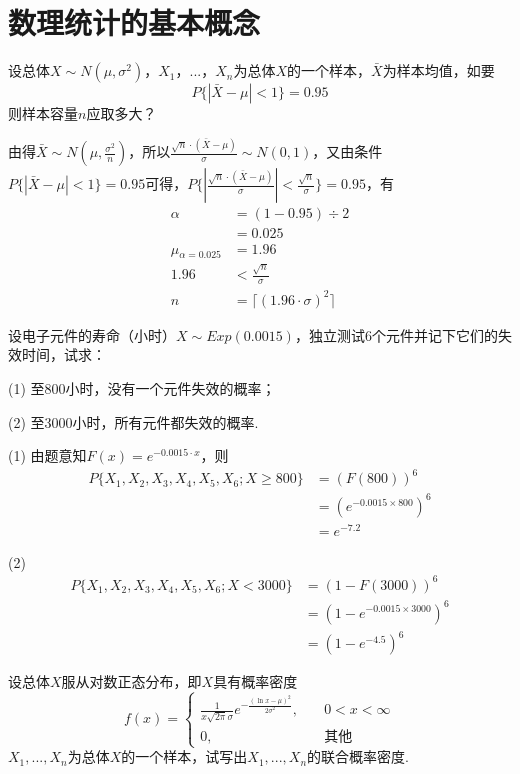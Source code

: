 \section{数理统计的基本概念}

   设总体$X \sim N(\mu, \sigma^2)$，$X_{1}$，...，$X_{n}$为总体$X$的一个样本，$\bar{X}$为样本均值，如要
  $$ P\{|\bar{X} - \mu| < 1\} = 0.95 $$
  则样本容量$n$应取多大？
  
  \xsv
  由得$\bar{X} \sim N(\mu, \frac{\sigma^2}{n})$，所以$\frac{\sqrt{n} \cdot (\bar{X} - \mu)}{\sigma} \sim N(0, 1)$，又由条件$P\{|\bar{X} - \mu| < 1\} = 0.95$可得，$P\{|\frac{\sqrt{n} \cdot (\bar{X} - \mu)}{\sigma}| < \frac{\sqrt{n}}{\sigma}\} = 0.95$，有
  \[ \begin{split}
    \alpha &= (1 - 0.95) \div 2\\
    &= 0.025\\
    \mu{}_{\alpha{}=0.025} &= 1.96\\
    1.96 &< \frac{\sqrt{n}}{\sigma}\\
    n &= \lceil (1.96 \cdot \sigma)^2 \rceil
  \end{split} \]

   设电子元件的寿命（小时）$X \sim Exp(0.0015)$，独立测试6个元件并记下它们的失效时间，试求：
  
  (1) 至800小时，没有一个元件失效的概率；
  
  (2) 至3000小时，所有元件都失效的概率.
  
  \xsv
  (1) 由题意知$F(x) = e^{-0.0015 \cdot x}$，则
  \[ \begin{split}
    P\{X_{1}, X_{2}, X_{3}, X_{4}, X_{5}, X_{6}; X \geq 800\} &= (F(800))^6\\
    &= (e^{-0.0015 \times 800})^6\\
    &= e^{-7.2}
  \end{split} \]
  
  (2)
  \[ \begin{split}
    P\{X_{1}, X_{2}, X_{3}, X_{4}, X_{5}, X_{6}; X < 3000\} &= (1 - F(3000))^6\\
    &= (1 - e^{-0.0015 \times 3000})^6\\
    &= (1 - e^{-4.5})^6
  \end{split} \]
   
   设总体$X$服从对数正态分布，即$X$具有概率密度
  \[ 
    f(x) = 
    \begin{cases}
      \frac{1}{x \sqrt{2\pi} \sigma} e^{-\frac{(\ln{x} - \mu)^2}{2 \sigma^2}},\quad &0 < x < \infty\\
      0,\quad &\text{其他}
    \end{cases}
  \]
  $X_1, ..., X_n$为总体$X$的一个样本，试写出$X_1, ...,X_n$的联合概率密度.
  
